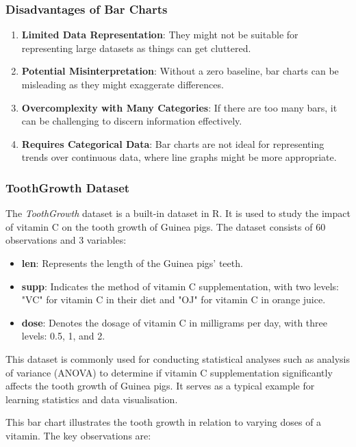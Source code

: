 \documentclass{article}\usepackage[]{graphicx}\usepackage[]{xcolor}
\begin{document}
\subsubsection{Disadvantages of Bar Charts}
\begin{enumerate}
    \item \textbf{Limited Data Representation}: They might not be suitable for representing large datasets as things can get cluttered.
    \item \textbf{Potential Misinterpretation}: Without a zero baseline, bar charts can be misleading as they might exaggerate differences.
    \item \textbf{Overcomplexity with Many Categories}: If there are too many bars, it can be challenging to discern information effectively.
    \item \textbf{Requires Categorical Data}: Bar charts are not ideal for representing trends over continuous data, where line graphs might be more appropriate.
\end{enumerate}
\subsubsection{ToothGrowth Dataset}

The \textit{ToothGrowth} dataset is a built-in dataset in R. It is used to study the impact of vitamin C on the tooth growth of Guinea pigs. The dataset consists of 60 observations and 3 variables:

\begin{itemize}
    \item \textbf{len}: Represents the length of the Guinea pigs' teeth.
    \item \textbf{supp}: Indicates the method of vitamin C supplementation, with two levels: "VC" for vitamin C in their diet and "OJ" for vitamin C in orange juice.
    \item \textbf{dose}: Denotes the dosage of vitamin C in milligrams per day, with three levels: 0.5, 1, and 2.
\end{itemize}

This dataset is commonly used for conducting statistical analyses such as analysis of variance (ANOVA) to determine if vitamin C supplementation significantly affects the tooth growth of Guinea pigs. It serves as a typical example for learning statistics and data visualisation.

This bar chart illustrates the tooth growth in relation to varying doses of a vitamin. The key observations are:
\end{document}
